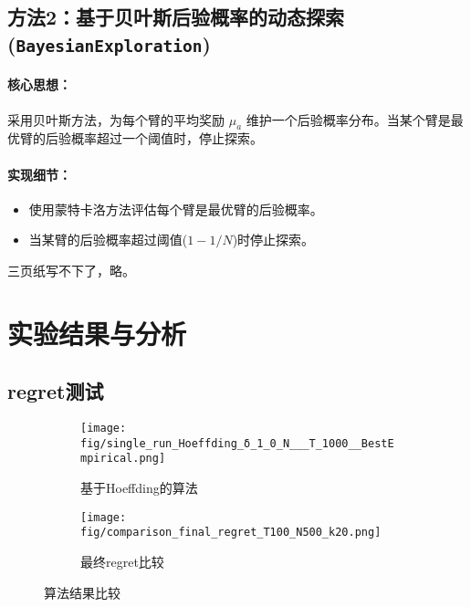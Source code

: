 \documentclass[6pt, a4paper]{ctexart} %
\newcommand{\N}{\ensuremath{N}}
\begin{document}
\subsection{方法2：基于贝叶斯后验概率的动态探索 (\texttt{BayesianExploration})}

\paragraph{核心思想：} 采用贝叶斯方法，为每个臂的平均奖励 $\mu_a$ 维护一个后验概率分布。当某个臂是最优臂的后验概率超过一个阈值时，停止探索。

\paragraph{实现细节：}
\begin{itemize}
    \item 使用蒙特卡洛方法评估每个臂是最优臂的后验概率。
    \item 当某臂的后验概率超过阈值($1-1/\N$)时停止探索。
\end{itemize}
三页纸写不下了，略。
\section{实验结果与分析}
\subsection{regret测试}
\begin{figure}[htbp]
    \centering
    \begin{subfigure}[b]{0.48\textwidth}
        \texttt{[image: fig/single\_run\_Hoeffding\_δ\_1\_0\_N\_\_\_T\_1000\_\_BestEmpirical.png]}
        \caption{基于Hoeffding的算法}
        \label{fig:image5}
    \end{subfigure}
    \hfill
    \begin{subfigure}[b]{0.48\textwidth}
        \texttt{[image: fig/comparison\_final\_regret\_T100\_N500\_k20.png]}
        \caption{最终regret比较}
        \label{fig:image6}
    \end{subfigure}
    \caption{算法结果比较}
    \label{fig:both_images2}
\end{figure}
\subsection{}
\end{document}
